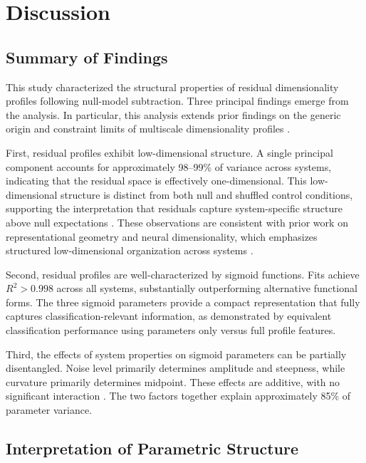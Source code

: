 \section{Discussion}

\subsection{Summary of Findings}

This study characterized the structural properties of residual dimensionality profiles following null-model subtraction. Three principal findings emerge from the analysis. In particular, this analysis extends prior findings on the generic origin and constraint limits of multiscale dimensionality profiles \citep{paper3, paper4}.

First, residual profiles exhibit low-dimensional structure. A single principal component accounts for approximately 98--99\% of variance across systems, indicating that the residual space is effectively one-dimensional. This low-dimensional structure is distinct from both null and shuffled control conditions, supporting the interpretation that residuals capture system-specific structure above null expectations \citep{levina2005maximum, jolliffe2002principal}. These observations are consistent with prior work on representational geometry and neural dimensionality, which emphasizes structured low-dimensional organization across systems \citep{kriegeskorte2013representational, cunningham2014dimensionality}.

Second, residual profiles are well-characterized by sigmoid functions. Fits achieve $R^2 > 0.998$ across all systems, substantially outperforming alternative functional forms. The three sigmoid parameters provide a compact representation that fully captures classification-relevant information, as demonstrated by equivalent classification performance using parameters only versus full profile features.

Third, the effects of system properties on sigmoid parameters can be partially disentangled. Noise level primarily determines amplitude and steepness, while curvature primarily determines midpoint. These effects are additive, with no significant interaction \citep{ward1963hierarchical}. The two factors together explain approximately 85\% of parameter variance.

\subsection{Interpretation of Parametric Structure}

